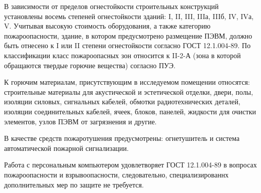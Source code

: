 В зависимости от пределов огнестойкости строительных конструкций установлены восемь степеней огнестойкости зданий: I, II, III, IIIа, IIIб, IV, IVа, V. Учитывая высокую стоимость оборудования, а также категорию пожароопасности, здание, в котором предусмотрено размещение ПЭВМ, должно быть отнесено к I или II степени огнестойкости согласно ГОСТ 12.1.004-89. По классификации класс пожароопасных зон относится к II-2-А (зона в которой обращаются твердые горючие вещества) согласно ПУЭ.

К горючим материалам, присутствующим в исследуемом помещении относятся: строительные материалы для акустической и эстетической отделки, двери, полы, изоляции силовых, сигнальных кабелей, обмотки радиотехнических деталей, изоляции соединительных кабелей, ячеек, блоков, панелей, жидкости для очистки элементов, узлов ПЭВМ от загрязнения и другие.

В качестве средств пожаротушения предусмотрены: огнетушитель и система автоматической пожарной сигнализации.

Работа с персональным компьютером удовлетворяет ГОСТ 12.1.004-89 в вопросах пожароопасности и взрывоопасности, следовательно, специализированнх дополнительных мер по защите не требуется.
